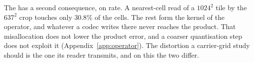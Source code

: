 The  has a second consequence, on rate. A nearest-cell read of a
$1024^2$ tile by the $637^2$ crop touches only $30.8\%$ of the cells. The
rest form the kernel of the operator, and whatever a codec writes there
never reaches the product. That misallocation does not lower the product
error, and a coarser quantisation step does not exploit it
(Appendix~\ref{app:operator}). The distortion a carrier-grid study
should  is the one its reader transmits, and on this  the
two differ.
